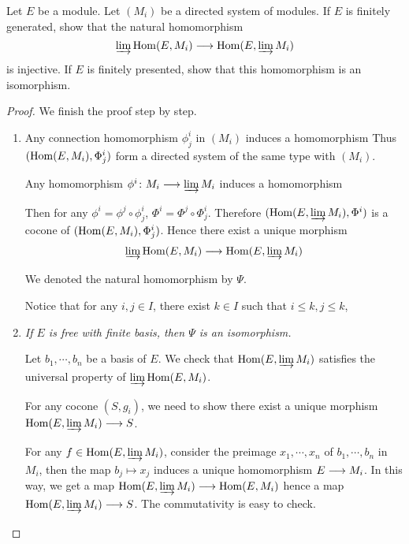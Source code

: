   \begin{ex}
    Let $E$ be a module. Let $(M_i)$ be a directed system of modules. If $E$ is finitely generated, show that the natural homomorphism
    \begin{equation*}
      \operatorname*{\underrightarrow{\lim}} \operatorname{Hom}(E,M_i) \longrightarrow \operatorname{Hom}(E,\operatorname*{\underrightarrow{\lim}} M_i)
    \end{equation*}
    is injective. If $E$ is finitely presented, show that this homomorphism is an isomorphism.
  \end{ex}
  \begin{proof}
    We finish the proof step by step.
    \begin{enumerate}
      \item Any connection homomorphism $\phi^i_j$ in $(M_i)$ induces a homomorphism
                 Thus $(\operatorname{Hom}(E,M_i),\Phi^i_j)$ form a directed system of the same type with $(M_i)$.

                 Any homomorphism $\phi^i\colon M_i\longrightarrow\operatorname*{\underrightarrow{\lim}} M_i$ induces a homomorphism

                 Then for any $\phi^i=\phi^j\circ\phi^i_j$, $\Phi^i=\Phi^j\circ\Phi^i_j$. Therefore $(\operatorname{Hom}(E,\operatorname*{\underrightarrow{\lim}} M_i),\Phi^i)$ is a cocone of $(\operatorname{Hom}(E,M_i),\Phi^i_j)$. Hence there exist a unique morphism
                 \begin{equation*}
                    \operatorname*{\underrightarrow{\lim}} \operatorname{Hom}(E,M_i) \longrightarrow \operatorname{Hom}(E,\operatorname*{\underrightarrow{\lim}} M_i)
                 \end{equation*}

                 We denoted the natural homomorphism by $\Psi$.

                 Notice that for any $i,j\in I$, there exist $k\in I$ such that $i\leqslant k,j\leqslant k$,
      \item \emph{If $E$ is free with finite basis, then $\Psi$ is an isomorphism.}

                 Let $b_1,\cdots,b_n$ be a basis of $E$. We check that $\operatorname{Hom}(E,\operatorname*{\underrightarrow{\lim}} M_i)$ satisfies the universal property of $\operatorname*{\underrightarrow{\lim}} \operatorname{Hom}(E,M_i)$.

                 For any cocone $(S,g_i)$, we need to show there exist a unique morphism $\operatorname{Hom}(E,\operatorname*{\underrightarrow{\lim}} M_i)\longrightarrow S$.

                 For any $f\in\operatorname{Hom}(E,\operatorname*{\underrightarrow{\lim}} M_i)$, consider the preimage $x_1,\cdots,x_n$ of $b_1,\cdots,b_n$ in $M_i$, then the map $b_j\mapsto x_j$ induces a unique homomorphism $E\longrightarrow M_i$.
                 In this way, we get a map $\operatorname{Hom}(E,\operatorname*{\underrightarrow{\lim}} M_i)\longrightarrow \operatorname{Hom}(E,M_i)$ hence a map $\operatorname{Hom}(E,\operatorname*{\underrightarrow{\lim}} M_i)\longrightarrow S$. The commutativity is easy to check.


\end{enumerate}
\end{proof}
